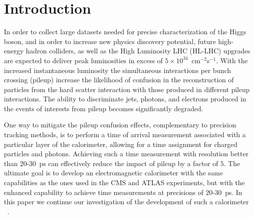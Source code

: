 \section{Introduction}

In order to collect large datasets needed for precise characterization of the
Higgs boson, and in order to increase new physics discovery potential, future
high-energy hadron colliders, as well as the High Luminosity LHC (HL-LHC)
upgrades are expected to deliver peak luminosities in excess of $5\times
10^{34}$~cm$^{-2}$s$^{-1}$. With the increased instantaneous luminosity the
simultaneous interactions per bunch crossing (pileup) increase the likelihood of
confusion in the reconstruction of particles from the hard scatter interaction
with those produced in different pileup interactions. The ability to
discriminate jets, photons, and electrons produced in the events of interests
from pileup becomes significantly degraded. 

One way to mitigate the pileup confusion effects, complementary to precision tracking 
methods, is to perform a time of arrival measurement associated with a particular layer of the
calorimeter, allowing for a time assignment for charged particles and photons.
Achieving such a time measurement with resolution better than $20$-$30$~ps
can effectively reduce the impact of pileup by a factor of $5$. The ultimate 
goal is to develop an electromagnetic calorimeter with the same capabilities as 
the ones used in the CMS and ATLAS experiments, but with the enhanced capability 
to achieve time measurements at precisions of $20$-$30$~ps.
In this paper we continue our investigation of the development of such a calorimeter
~\cite{Anderson:2015gha,MCPFastCaloNIMA,Ronzhin:2015pba,Ronzhin2015288}. 

